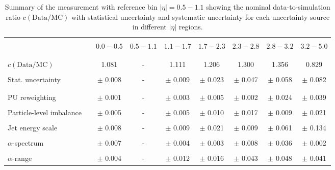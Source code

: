 \begin{table}[!hp]
\centering
\caption{Summary of the measurement with reference bin $|\eta| = 0.5 - 1.1$ showing the nominal data-to-simulation ratio $c\mathrm{(Data/MC)}$ with statistical uncertainty and systematic uncertainty for each uncertainty source in different $|\eta|$ regions.}
\label{tab:syst_uncert_summary_forward_nexttocentral}
\begin{tabular}{lcccccccc}
\hline
\hline
 & & & & & & & & \\
 & & $0.0 - 0.5$ & $0.5 - 1.1$ & $1.1 - 1.7$ & $1.7 - 2.3$ & $2.3 - 2.8$ & $2.8 - 3.2$ & $3.2-5.0$ \\
 & & & & & & & & \\
\hline
 & & & & & & & & \\
 $c\mathrm{(Data/MC)}$ & & 1.081 & - & 1.111 & 1.206 & 1.300 & 1.356 & 0.829 \\
 & & & & & & & & \\
 Stat. uncertainty & & $\pm$ 0.008 & - & $\pm$ 0.009 & $\pm$ 0.023 & $\pm$ 0.047 & $\pm$ 0.058 & $\pm$ 0.082 \\
 & & & & & & & & \\
\hline
 & & & & & & & & \\
 PU reweighting & & $\pm$ 0.001 & - & $\pm$ 0.003 & $\pm$ 0.005 & $\pm$ 0.002 & $\pm$ 0.024 & $\pm$ 0.039 \\
 & & & & & & & & \\
 Particle-level imbalance & & $\pm$ 0.005 & - & $\pm$ 0.005 & $\pm$ 0.010 & $\pm$ 0.017 & $\pm$ 0.009 & $\pm$ 0.021 \\
 & & & & & & & & \\
 Jet energy scale & & $\pm$ 0.008 & - & $\pm$ 0.009 & $\pm$ 0.021 & $\pm$ 0.009 & $\pm$ 0.061 & $\pm$ 0.134 \\
 & & & & & & & & \\
 $\alpha$-spectrum & & $\pm$ 0.007 & - & $\pm$ 0.004 & $\pm$ 0.003 & $\pm$ 0.008 & $\pm$ 0.036 & $\pm$ 0.002 \\
 & & & & & & & & \\
 $\alpha$-range & & $\pm$ 0.004 & - & $\pm$ 0.012 & $\pm$ 0.016 & $\pm$ 0.043 & $\pm$ 0.048 & $\pm$ 0.041 \\

\end{tabular}
\end{table}
